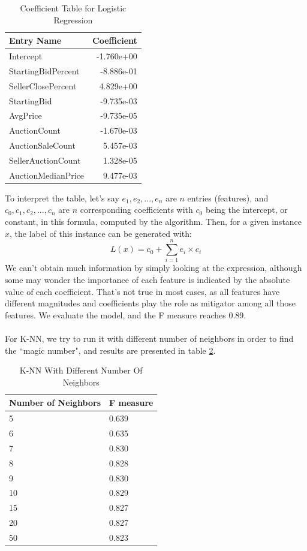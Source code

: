 \documentclass[CEJM,PDF]{cej} %
\begin{document}
\begin{table}[h]
\centering
\caption{Coefficient Table for Logistic Regression}
\label{r-lr}
\begin{tabular}{@{}|l|r|@{}}
\toprule
\hline
Entry Name  & Coefficient \\ \midrule
\hline
Intercept & -1.760e+00   \\
\hline
StartingBidPercent & -8.886e-01 \\
\hline
SellerClosePercent & 4.829e+00  \\
\hline
StartingBid & -9.735e-03  \\
\hline
AvgPrice & -9.735e-05 \\
\hline
AuctionCount & -1.670e-03   \\
\hline
AuctionSaleCount & 5.457e-03  \\
\hline
SellerAuctionCount & 1.328e-05   \\
\hline
AuctionMedianPrice & 9.477e-03  \\ \bottomrule
\hline
\end{tabular}
\end{table}

To interpret the table, let's say $e_1, e_2, ..., e_n$ are $n$ entries (features), and $c_0, c_1, c_2, ..., c_n$ are $n$ corresponding coefficients with $c_0$ being the intercept, or constant, in this formula, computed by the algorithm. Then, for a given instance $x$, the label of this instance can be generated with:
$$L(x) = c_0 + \sum_{i=1}^{n}e_i\times c_i$$
We can't obtain much information by simply looking at the expression, although some may wonder the importance of each feature is indicated by the absolute value of each coefficient. That's not true in most cases, as all features have different magnitudes and coefficients play the role as mitigator among all those features. We evaluate the model, and the F measure reaches 0.89.\\
\\
For K-NN, we try to run it with different number of neighbors in order to find the ``magic number", and results are presented in table \ref{r-knn}.

\begin{table}[h]
\centering
\caption{K-NN With Different Number Of Neighbors}
\label{r-knn}
\begin{tabular}{@{}|l|l|@{}}
\toprule
\hline
Number of Neighbors  & F measure \\ \midrule
\hline
5 & 0.639   \\
\hline
6 & 0.635   \\
\hline
7  & 0.830  \\
\hline
8 & 0.828  \\
\hline
9  & 0.830  \\ 
\hline
10 & 0.829 \\ 
\hline
15 & 0.827 \\ 
\hline
20 & 0.827 \\
\hline
50 & 0.823 \\ \bottomrule
\hline
\end{tabular}
\end{table}
\end{document}
